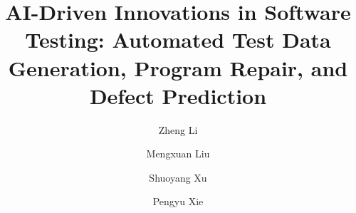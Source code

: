 \documentclass[manuscript,screen,review]{acmart}
\begin{document}
\title{AI-Driven Innovations in Software Testing: Automated Test Data Generation, Program Repair, and Defect Prediction}

\author{Zheng Li}
\author{Mengxuan Liu}
\author{Shuoyang Xu}
\author{Pengyu Xie}

\renewcommand{\shortauthors}{Li et al.}
\end{document}

